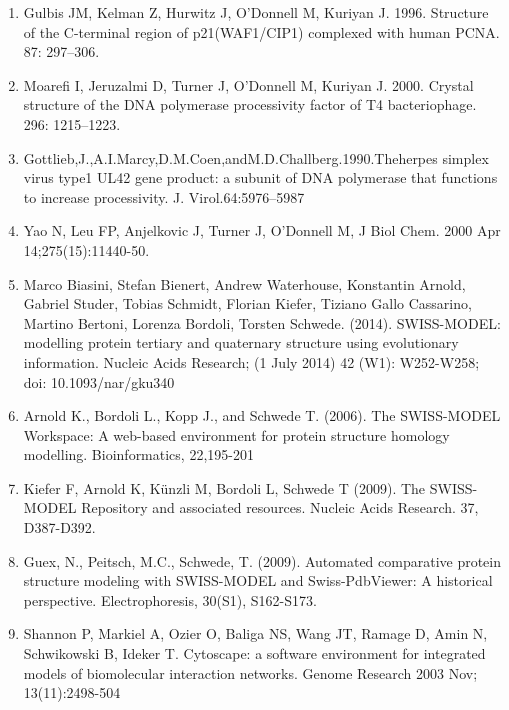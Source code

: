 \documentclass[a4paper,12pt]{article}
\begin{document}
\begin{enumerate}
	\item Gulbis JM, Kelman Z, Hurwitz J, O’Donnell M, Kuriyan J. 1996. Structure of the C-terminal region of p21(WAF1/CIP1) complexed with human PCNA. 87: 297–306.
	
	\item Moarefi I, Jeruzalmi D, Turner J, O’Donnell M, Kuriyan J. 2000. Crystal structure of the DNA polymerase processivity factor of T4 bacteriophage. 296: 1215–1223.
	
	\item \hypertarget{Gottlieb}{Gottlieb,J.,A.I.Marcy,D.M.Coen,andM.D.Challberg.1990.Theherpes simplex virus type1 UL42 gene product: a subunit of DNA polymerase that functions to increase processivity. J. Virol.64:5976–5987}
	
	\item \hypertarget{YaoN}{Yao N, Leu FP, Anjelkovic J, Turner J, O'Donnell M, J Biol Chem. 2000 Apr 14;275(15):11440-50.}

	\item \hypertarget{swissprot}{Marco Biasini, Stefan Bienert, Andrew Waterhouse, Konstantin Arnold, Gabriel Studer, Tobias Schmidt, Florian Kiefer, Tiziano Gallo Cassarino, Martino Bertoni, Lorenza Bordoli, Torsten Schwede. (2014). SWISS-MODEL: modelling protein tertiary and quaternary structure using evolutionary information. Nucleic Acids Research; (1 July 2014) 42 (W1): W252-W258; doi: 10.1093/nar/gku340} 
	
	\item Arnold K., Bordoli L., Kopp J., and Schwede T. (2006). The SWISS-MODEL Workspace: A web-based environment for protein structure homology modelling. Bioinformatics, 22,195-201
	
	\item Kiefer F, Arnold K, Künzli M, Bordoli L, Schwede T (2009). The SWISS-MODEL Repository and associated resources. Nucleic Acids Research. 37, D387-D392.
	
	\item Guex, N., Peitsch, M.C., Schwede, T. (2009). Automated comparative protein structure modeling with SWISS-MODEL and Swiss-PdbViewer: A historical perspective. Electrophoresis, 30(S1), S162-S173.
	
	\item  \hypertarget{Cytoscape}{Shannon P, Markiel A, Ozier O, Baliga NS, Wang JT, Ramage D, Amin N, Schwikowski B, Ideker T. Cytoscape: a software environment for integrated models of biomolecular interaction networks. Genome Research 2003 Nov; 13(11):2498-504}
	
	
	
\end{enumerate}
  
\end{document}
